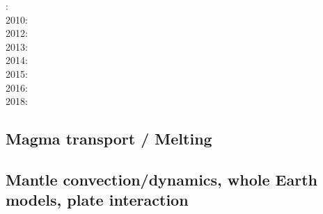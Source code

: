 : \cite{gamc08}\\
2010: \cite{stto10}\\
2012: \cite{stto12}\\
2013: \cite{limc13}\cite{bogs13a}\\
2014: \cite{budt14}\\
2015: \cite{musd15}\cite{hafg15}\\
2016: \cite{dost16}\\
2018: \cite{daga18}

\subsection*{Magma transport / Melting}

\cite{yatd12}
\cite{lorg18}



\subsection*{Mantle convection/dynamics, whole Earth models, plate interaction}

